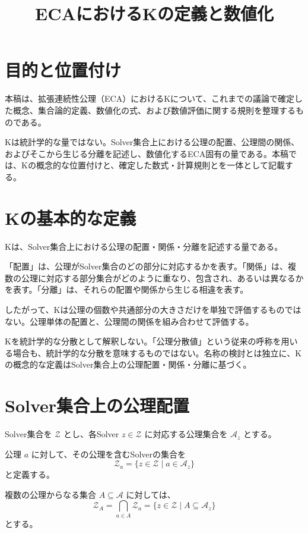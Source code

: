 \documentclass[a4paper,12pt]{article}
\title{ECAにおけるKの定義と数値化}
\author{}
\date{}
\begin{document}
\maketitle

\section{目的と位置付け}

本稿は、拡張連続性公理（ECA）におけるKについて、これまでの議論で確定した概念、集合論的定義、数値化の式、および数値評価に関する規則を整理するものである。

Kは統計学的な量ではない。Solver集合上における公理の配置、公理間の関係、およびそこから生じる分離を記述し、数値化するECA固有の量である。本稿では、Kの概念的な位置付けと、確定した数式・計算規則とを一体として記載する。

\section{Kの基本的な定義}

Kは、Solver集合上における公理の配置・関係・分離を記述する量である。

「配置」は、公理がSolver集合のどの部分に対応するかを表す。「関係」は、複数の公理に対応する部分集合がどのように重なり、包含され、あるいは異なるかを表す。「分離」は、それらの配置や関係から生じる相違を表す。

したがって、Kは公理の個数や共通部分の大きさだけを単独で評価するものではない。公理単体の配置と、公理間の関係を組み合わせて評価する。

Kを統計学的な分散として解釈しない。「公理分散値」という従来の呼称を用いる場合も、統計学的な分散を意味するものではない。名称の検討とは独立に、Kの概念的な定義はSolver集合上の公理配置・関係・分離に基づく。

\section{Solver集合上の公理配置}

Solver集合を $\mathcal{Z}$ とし、各Solver $z\in\mathcal{Z}$ に対応する公理集合を $\mathcal{A}_z$ とする。

公理 $a$ に対して、その公理を含むSolverの集合を
\[
\mathcal{Z}_a
=
\{z\in\mathcal{Z}\mid a\in\mathcal{A}_z\}
\]
と定義する。

複数の公理からなる集合 $A\subseteq\mathcal{A}$ に対しては、
\[
\mathcal{Z}_A
=
\bigcap_{a\in A}\mathcal{Z}_a
=
\{z\in\mathcal{Z}\mid A\subseteq\mathcal{A}_z\}
\]
とする。
\end{document}
